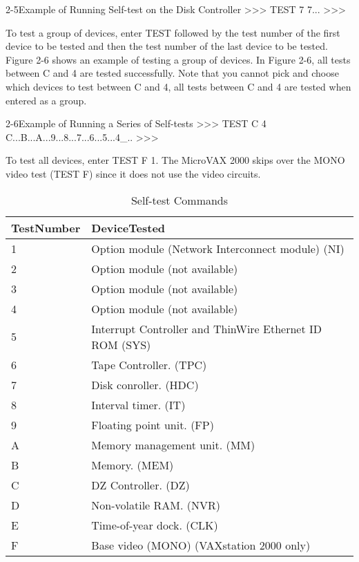 \begin{ttfig}{2-5}{Example of Running Self-test on the Disk Controller}
>>> TEST 7
  7...
>>>
\end{ttfig}

\newpage

To test a group of devices, enter TEST followed by the test number of the
first device to be tested and then the test number of the last device to be
tested. Figure 2-6 shows an example of testing a group of devices. In Figure
2-6, all tests between C and 4 are tested successfully. Note that you cannot
pick and choose which devices to test between C and 4, all tests between
C and 4 are tested when entered as a group.

\begin{ttfig}{2-6}{Example of Running a Series of Self-tests}
>>> TEST C 4
  C...B...A...9...8...7...6...5...4_..
>>>
\end{ttfig}

To test all devices, enter TEST F 1. The MicroVAX 2000 skips over the
MONO video test (TEST F) since it does not use the video circuits.

\begin{table}[H]
\caption{Self-test Commands}
\label{table:2-3}
\small
\begin{tabularx}{\textwidth}{p{2cm} p{8cm}}
\hline
\raggedright\textbf{Test\newline Number} & \textbf{Device\newline Tested} \\
\hline
1 & Option module (Network Interconnect module) (NI) \\[0.5em]
2 & Option module (not available) \\[0.5em]
3 & Option module (not available) \\[0.5em]
4 & Option module (not available) \\[0.5em]
5 & Interrupt Controller and ThinWire Ethernet ID ROM (SYS) \\[0.5em]
6 & Tape Controller. (TPC) \\[0.5em]
7 & Disk conroller. (HDC) \\[0.5em]
8 & Interval timer. (IT) \\[0.5em]
9 & Floating point unit. (FP) \\[0.5em]
A & Memory management unit. (MM) \\[0.5em]
B & Memory. (MEM) \\[0.5em]
C & DZ Controller. (DZ) \\[0.5em]
D & Non-volatile RAM. (NVR) \\[0.5em]
E & Time-of-year dock. (CLK) \\[0.5em]
F & Base video (MONO) (VAXstation 2000 only) \\[0.5em]
\hline
\end{tabularx}
\end{table}

